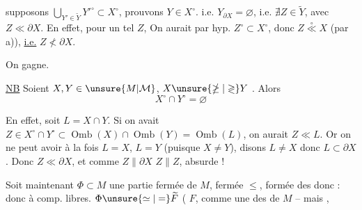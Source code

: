 
supposons $\displaystyle\bigcup_{Y'\in\widetilde Y}Y'^\circ\subset X^\circ$, prouvons $Y\in X^\circ$. i.e. $Y_{\partial X}=\varnothing$,  i.e. $\nexists Z\in\widetilde Y$, avec $Z\ll\partial X$. En effet, pour un tel $Z$,   On aurait par hyp. $Z^\circ\subset X^\circ$, donc $Z\overset{\circ}{\ll}X$ (par a)), \uline{i.e.} $Z\nless\partial X$.

On gagne.

\uline{NB} Soient $X,Y\in\unsure{M|\mathcal M}$, $X\unsure{\ngeq|\gtrless}Y$ . Alors
\[
X^\circ\cap Y^\circ=\varnothing
\]

En effet, soit $L=X\cap Y$. Si on avait $Z\in X^\circ\cap Y^\circ\subset\operatorname{Omb}(X)\cap\operatorname{Omb}(Y)=\operatorname{Omb}(L)$, on aurait  $Z\ll L$. Or on ne peut avoir à la fois $L=X$, $L=Y$ (puisque $X\ne Y$), disons $L\ne X$ donc $L\subset\partial X$. Donc $Z\ll\partial X$, et comme $Z\parallel\partial X$ $Z\parallel Z$, absurde !

 Soit maintenant $\Phi\subset M$ une  partie fermée de $M$, fermée  $\leq$, formée des   donc : donc à comp. libres.  $\Phi\unsure{\simeq|=}\widetilde F$ (  $F$,  comme une des  de $M$ -- mais ,
